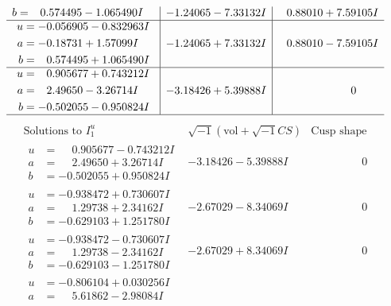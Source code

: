 \documentclass[1p]{elsarticle_modified}
\theoremstyle{definition}
\newcommand{\I}{\sqrt{-1}}
\begin{document}
$$\begin{array}{c|c|c}
\begin{aligned}
b &= \phantom{-}0.574495 - 1.065490 I\end{aligned}
 & -1.24065 - 7.33132 I & \phantom{-}0.88010 + 7.59105 I \\ \hline\begin{aligned}
u &= -0.056905 - 0.832963 I \\
a &= -0.18731 + 1.57099 I \\
b &= \phantom{-}0.574495 + 1.065490 I\end{aligned}
 & -1.24065 + 7.33132 I & \phantom{-}0.88010 - 7.59105 I \\ \hline\begin{aligned}
u &= \phantom{-}0.905677 + 0.743212 I \\
a &= \phantom{-}2.49650 - 3.26714 I \\
b &= -0.502055 - 0.950824 I\end{aligned}
 & -3.18426 + 5.39888 I & \phantom{-0.000000 } 0\\
 \hline 
 \end{array}$$\newpage$$\begin{array}{c|c|c}  
\text{Solutions to }I^u_{1}& \I (\text{vol} + \sqrt{-1}CS) & \text{Cusp shape}\\
 \hline 
\begin{aligned}
u &= \phantom{-}0.905677 - 0.743212 I \\
a &= \phantom{-}2.49650 + 3.26714 I \\
b &= -0.502055 + 0.950824 I\end{aligned}
 & -3.18426 - 5.39888 I & \phantom{-0.000000 } 0 \\ \hline\begin{aligned}
u &= -0.938472 + 0.730607 I \\
a &= \phantom{-}1.29738 + 2.34162 I \\
b &= -0.629103 + 1.251780 I\end{aligned}
 & -2.67029 - 8.34069 I & \phantom{-0.000000 } 0 \\ \hline\begin{aligned}
u &= -0.938472 - 0.730607 I \\
a &= \phantom{-}1.29738 - 2.34162 I \\
b &= -0.629103 - 1.251780 I\end{aligned}
 & -2.67029 + 8.34069 I & \phantom{-0.000000 } 0 \\ \hline\begin{aligned}
u &= -0.806104 + 0.030256 I \\
a &= \phantom{-}5.61862 - 2.98084 I \\

\end{aligned}
\end{array}$$
\end{document}
